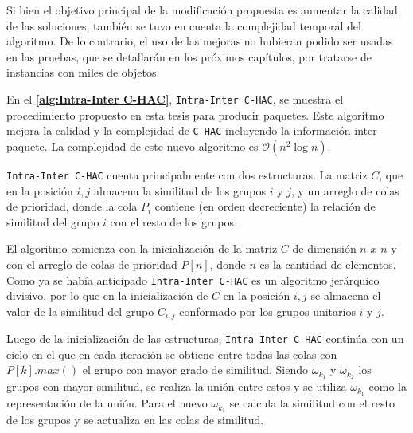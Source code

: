 Si bien el objetivo principal de la modificación propuesta es aumentar la calidad de las soluciones, también se tuvo en cuenta la complejidad temporal del algoritmo. De lo contrario, el uso de las mejoras no hubieran podido ser usadas en las pruebas, que se detallarán en los próximos capítulos, por tratarse de instancias con miles de objetos.

En el \textbf{\autoref{alg:Intra-Inter C-HAC}}, \texttt{Intra-Inter C-HAC}, se muestra el procedimiento propuesto en esta tesis para producir paquetes. Este algoritmo mejora la calidad y la complejidad de  \texttt{C-HAC} incluyendo la información inter-paquete. La complejidad de este nuevo algoritmo es $\mathcal{O}(n^{2}\log n)$. 

\texttt{Intra-Inter C-HAC} cuenta principalmente con dos estructuras. La matriz $C$, que en la posición $i,j$ almacena la similitud de los grupos $i$ y $j$, y un arreglo de colas de prioridad, donde la cola $P_i$ contiene (en orden decreciente) la relación de similitud del grupo $i$ con el resto de los grupos.

El algoritmo comienza con la inicialización de la matriz $C$ de dimensión $n$ $x$ $n$ y con el arreglo de colas de prioridad $P\left[n\right]$, donde $n$ es la cantidad de elementos. Como ya se había anticipado \texttt{Intra-Inter C-HAC} es un algoritmo jerárquico divisivo, por lo que en la inicialización de $C$ en la posición $i,j$ se almacena el valor de la similitud del grupo $C_{i,j}$ conformado por los grupos unitarios $i$ y $j$.

Luego de la inicialización de las estructuras, \texttt{Intra-Inter C-HAC} continúa con un ciclo en el que en cada iteración se obtiene entre todas las colas con $P\left[k\right].max()$ el grupo con mayor grado de similitud. Siendo $\omega_{k_{1}}$ y $\omega_{k_{2}}$ los grupos con mayor similitud, se realiza la unión entre estos y se utiliza $\omega_{k_{1}}$  como la representación de la unión. Para el nuevo  $\omega_{k_{1}}$ se calcula la similitud con el resto de los grupos y se actualiza en las colas de similitud.

